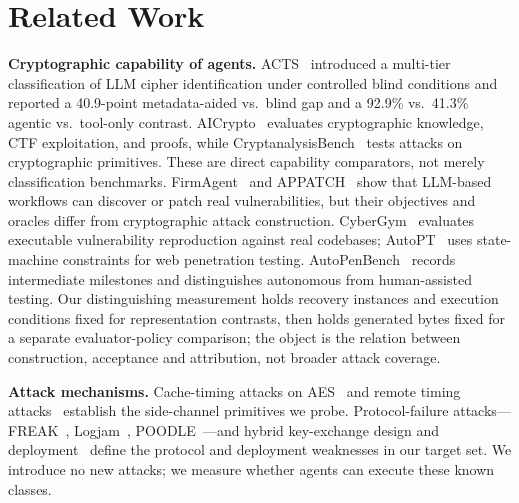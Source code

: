 \section{Related Work}\label{sec:related}
\textbf{Cryptographic capability of agents.} ACTS~\cite{acts} introduced a
multi-tier classification of LLM cipher identification under controlled blind
conditions and reported a 40.9-point metadata-aided vs.\ blind gap and a
92.9\% vs.\ 41.3\% agentic vs.\ tool-only contrast. AICrypto~\cite{aicrypto}
evaluates cryptographic knowledge, CTF exploitation, and proofs, while
CryptanalysisBench~\cite{cryptanalysisbench} tests attacks on cryptographic
primitives. These are direct capability comparators, not merely classification
benchmarks. FirmAgent~\cite{firmagent} and APPATCH~\cite{appatch} show that LLM-based
workflows can discover or patch real vulnerabilities, but their objectives and
oracles differ from cryptographic attack construction. CyberGym~\cite{cybergym} evaluates executable vulnerability
reproduction against real codebases; AutoPT~\cite{autopt} uses state-machine
constraints for web penetration testing. AutoPenBench~\cite{autopenbench}
records intermediate milestones and distinguishes autonomous from human-assisted
testing. Our distinguishing measurement holds recovery instances and execution
conditions fixed for representation contrasts, then holds generated bytes
fixed for a separate evaluator-policy comparison; the object is the relation
between construction, acceptance and attribution, not broader attack coverage.

\textbf{Attack mechanisms.} Cache-timing attacks on
AES~\cite{bernstein,osvik,liu15,gruss16,gullasch11} and remote timing
attacks~\cite{brumley03,kocher} establish the side-channel primitives we probe.
Protocol-failure attacks---FREAK~\cite{freak}, Logjam~\cite{logjam},
POODLE~\cite{poodle}---and hybrid key-exchange design and
deployment~\cite{bindel,paquin2020,rfc9954,rfc10024,nist2024} define the
protocol and deployment weaknesses in our target set. We introduce no new
attacks; we measure whether agents can execute these known classes.

